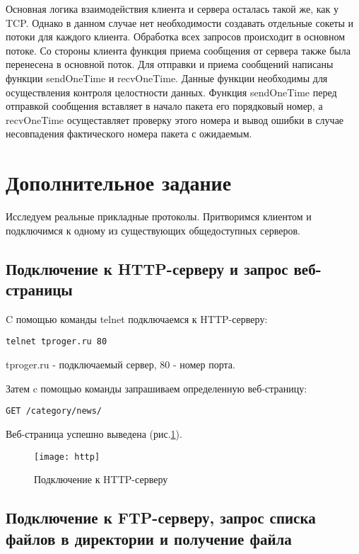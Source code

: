 Основная логика взаимодействия клиента и сервера осталась такой же, как у TCP. Однако в данном случае нет необходимости создавать отдельные сокеты и потоки для каждого клиента. Обработка всех запросов происходит в основном потоке. Со стороны клиента функция приема сообщения от сервера также была перенесена в основной поток. Для отправки и приема сообщений написаны функции sendOneTime и recvOneTime. Данные функции необходимы для осуществления контроля целостности данных. Функция sendOneTime перед отправкой сообщения вставляет в начало пакета его порядковый номер, а recvOneTime осущеставляет проверку этого номера и вывод ошибки в случае несовпадения фактического номера пакета с ожидаемым. 

\section{Дополнительное задание}

Исследуем реальные прикладные протоколы. Притворимся клиентом и подключимся к одному из существующих общедоступных серверов. 

\subsection{Подключение к HTTP-серверу и запрос веб-страницы}

C помощью команды telnet подключаемся к HTTP-серверу:

\begin{lstlisting}
telnet tproger.ru 80
\end{lstlisting}

tproger.ru - подключаемый сервер, 80 - номер порта.

Затем c помощью команды запрашиваем определенную веб-страницу:

\begin{lstlisting}
GET /category/news/
\end{lstlisting}

Веб-страница успешно выведена (рис.\ref{pic:http}).

\begin{figure}[H]
	\begin{center}
		\texttt{[image: http]}
		\caption{Подключение к HTTP-серверу} 
		\label{pic:http} %
	\end{center}
\end{figure}

\subsection{Подключение к FTP-серверу, запрос списка файлов в директории и получение файла}


